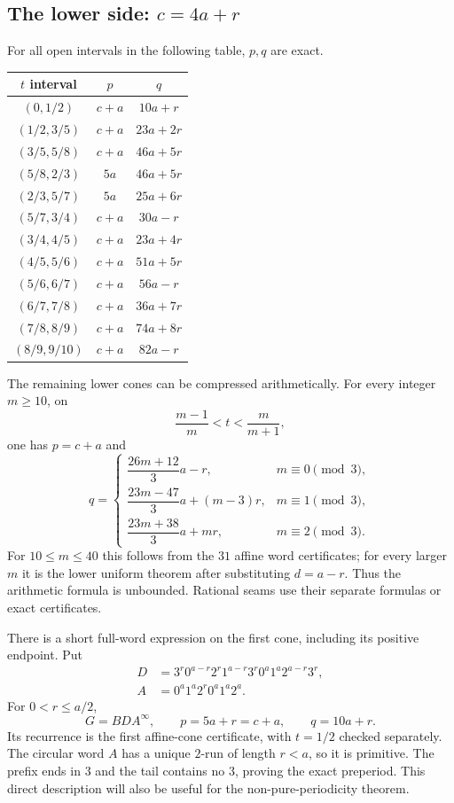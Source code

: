 \documentclass[11pt]{article}
\theoremstyle{remark}\newtheorem{remark}[theorem]{Remark}
\newcommand{\per}{^{\infty}}
\begin{document}
\subsection{The lower side: \texorpdfstring{$c=4a+r$}{c=4a+r}}
For all open intervals in the following table, $p,q$ are exact.
\begin{center}\small
\begin{tabular}{c|c|c}\toprule
$t$ interval & $p$ & $q$\\\midrule
$(0,1/2)$ & $c+a$ & $10a+r$\\
$(1/2,3/5)$ & $c+a$ & $23a+2r$\\
$(3/5,5/8)$ & $c+a$ & $46a+5r$\\
$(5/8,2/3)$ & $5a$ & $46a+5r$\\
$(2/3,5/7)$ & $5a$ & $25a+6r$\\
$(5/7,3/4)$ & $c+a$ & $30a-r$\\
$(3/4,4/5)$ & $c+a$ & $23a+4r$\\
$(4/5,5/6)$ & $c+a$ & $51a+5r$\\
$(5/6,6/7)$ & $c+a$ & $56a-r$\\
$(6/7,7/8)$ & $c+a$ & $36a+7r$\\
$(7/8,8/9)$ & $c+a$ & $74a+8r$\\
$(8/9,9/10)$ & $c+a$ & $82a-r$\\\bottomrule
\end{tabular}
\end{center}
The remaining lower cones can be compressed arithmetically. For every integer $m\ge10$, on
\[
\frac{m-1}{m}<t<\frac{m}{m+1},
\]
one has $p=c+a$ and
\[
q=\begin{cases}
\dfrac{26m+12}{3}a-r,&m\equiv0\pmod3,\\[3pt]
\dfrac{23m-47}{3}a+(m-3)r,&m\equiv1\pmod3,\\[3pt]
\dfrac{23m+38}{3}a+mr,&m\equiv2\pmod3.
\end{cases}
\]
For $10\le m\le40$ this follows from the $31$ affine word certificates; for every larger $m$ it is the lower uniform theorem after substituting $d=a-r$. Thus the arithmetic formula is unbounded. Rational seams use their separate formulas or exact certificates.

There is a short full-word expression on the first cone, including its positive endpoint. Put
\begin{align*}
D&=3^r0^{a-r}2^r1^{a-r}3^r0^a1^a2^{a-r}3^r,\\
A&=0^a1^a2^r0^a1^a2^a.
\end{align*}
For $0<r\le a/2$,
\begin{equation}\label{eq:lower-simple}
G=BD A\per,\qquad p=5a+r=c+a,\qquad q=10a+r.
\end{equation}
Its recurrence is the first affine-cone certificate, with $t=1/2$ checked separately. The circular word $A$ has a unique $2$-run of length $r<a$, so it is primitive. The prefix ends in $3$ and the tail contains no $3$, proving the exact preperiod. This direct description will also be useful for the non-pure-periodicity theorem.
\end{document}
